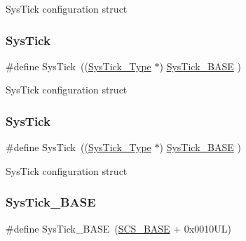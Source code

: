 Sys\+Tick configuration struct \mbox{\label{group___c_m_s_i_s__core__base_gacd96c53beeaff8f603fcda425eb295de}} 
\subsubsection{\texorpdfstring{SysTick}{SysTick}\hspace{0.1cm}{\footnotesize\ttfamily [11/12]}}
{\footnotesize\ttfamily \#define Sys\+Tick~((\mbox{\hyperlink{struct_sys_tick___type}{Sys\+Tick\+\_\+\+Type}}   $\ast$)     \mbox{\hyperlink{group___c_m_s_i_s__core__base_ga58effaac0b93006b756d33209e814646}{Sys\+Tick\+\_\+\+B\+A\+SE}}     )}

Sys\+Tick configuration struct \mbox{\label{group___c_m_s_i_s__core__base_gacd96c53beeaff8f603fcda425eb295de}} 
\subsubsection{\texorpdfstring{SysTick}{SysTick}\hspace{0.1cm}{\footnotesize\ttfamily [12/12]}}
{\footnotesize\ttfamily \#define Sys\+Tick~((\mbox{\hyperlink{struct_sys_tick___type}{Sys\+Tick\+\_\+\+Type}}   $\ast$)     \mbox{\hyperlink{group___c_m_s_i_s__core__base_ga58effaac0b93006b756d33209e814646}{Sys\+Tick\+\_\+\+B\+A\+SE}}     )}

Sys\+Tick configuration struct \mbox{\label{group___c_m_s_i_s__core__base_ga58effaac0b93006b756d33209e814646}} 
\subsubsection{\texorpdfstring{SysTick\_BASE}{SysTick\_BASE}\hspace{0.1cm}{\footnotesize\ttfamily [1/12]}}
{\footnotesize\ttfamily \#define Sys\+Tick\+\_\+\+B\+A\+SE~(\mbox{\hyperlink{group___c_m_s_i_s__core__base_ga3c14ed93192c8d9143322bbf77ebf770}{S\+C\+S\+\_\+\+B\+A\+SE}} +  0x0010\+U\+L)}

